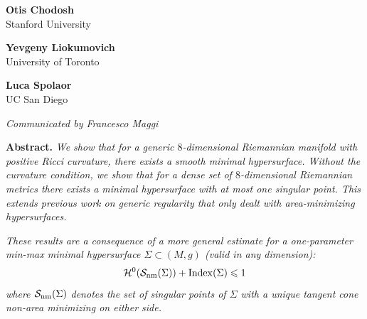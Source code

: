 \documentclass[12pt,twoside]{amsart}
\numberwithin{equation}{section}
\renewcommand{\leq}{\leqslant}
\renewcommand{\cH}{\mathcal H}
\DeclareMathOperator{\Index}{Index}
\begin{document}
\begin{minipage}[t]{.28\textwidth}
\begin{center}
{\large{\bf{Otis Chodosh}}} \\
\vskip0.15cm
\footnotesize{Stanford University}
\end{center}
\end{minipage}
\hfill
\noindent
\begin{minipage}[t]{.28\textwidth}
\begin{center}
{\large{\bf{Yevgeny Liokumovich}}} \\
\vskip0.15cm
\footnotesize{University of Toronto}
\end{center}
\end{minipage}
\hfill
\noindent
\begin{minipage}[t]{.28\textwidth}
\begin{center}
{\large{\bf{Luca Spolaor}}} \\
\vskip0.15cm
\footnotesize{UC San Diego} 
\end{center}
\end{minipage}

\vspace{1cm}


\begin{center}
\noindent \em{Communicated by Francesco Maggi}
\end{center}
\vspace{1cm}



\noindent \textbf{Abstract.} \textit{We show that for a generic $8$-dimensional Riemannian manifold with positive Ricci curvature, there exists a smooth minimal hypersurface. Without the curvature condition, we show that for a dense set of $8$-dimensional Riemannian metrics there exists a minimal hypersurface with at most one singular point. This extends previous work on generic regularity that only dealt with area-minimizing hypersurfaces.}

\textit{These results are a consequence of a more general estimate for a one-parameter min-max minimal hypersurface $\Sigma \subset (M,g)$ (valid in any dimension):
\[
\cH^{0} (\mathcal{S}_{\textnormal{nm}}(\Sigma)) +\Index(\Sigma) \leq 1
\]
where $\mathcal{S}_{\textnormal{nm}}(\Sigma)$ denotes the set of singular points of $\Sigma$ with a unique tangent cone non-area minimizing on either side.}
\vskip0.3cm
\end{document}

